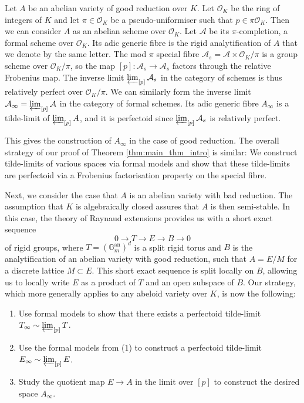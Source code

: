 \documentclass[10pt,oneside]{amsart}
\theoremstyle{definition}
\begin{document}
Let $A$ be an abelian variety of good reduction over $K$. Let $\mathcal O_K$ be the ring of integers of $K$ and let $\pi\in\mathcal O_K$ be a pseudo-uniformiser such that $p\in \pi\mathcal O_K$. Then we can consider $A$ as an abelian scheme over $\mathcal O_K$. Let $\mathcal A$ be its $\pi$-completion, a formal scheme over $\mathcal O_K$. Its adic generic fibre is the rigid analytification of $A$ that we denote by the same letter. The mod $\pi$ special fibre $\mathcal A_s = \mathcal A \times \mathcal O_K/\pi$ is a group scheme over $\mathcal O_K/\pi$, so the map $[p]:\mathcal A_s\rightarrow \mathcal A_s$ factors through the relative Frobenius map. The inverse limit $ \varprojlim_{[p]} \mathcal A_s $ in the category of schemes is thus relatively perfect over $\mathcal O_K/\pi$. We can similarly form the inverse limit $\mathcal A_{\infty} = \varprojlim_{[p]} \mathcal A$ in the category of formal schemes. Its adic generic fibre $A_\infty$ is a tilde-limit of $\varprojlim_{[p]}A$, and it is perfectoid since $ \varprojlim_{[p]} \mathcal A_s $ is relatively perfect.

This gives the construction of $A_\infty$ in the case of good reduction. The overall strategy of our proof of Theorem \ref{thm:main_thm_intro} is similar: We construct tilde-limits of various spaces via formal models and show that these tilde-limits are perfectoid via a Frobenius factorisation property on the special fibre. 

Next, we consider the case that $A$ is an abelian variety with bad reduction. The assumption that $K$ is algebraically closed assures that $A$ is then semi-stable.
In this case, the theory of Raynaud extensions provides us with a short exact sequence 
\[ 0 \rightarrow T \rightarrow E  \rightarrow  B  \rightarrow  0\]
of rigid groups, where $T = (\mathbb G_m^{\text{an}})^{d}$ is a split rigid torus and $B$ is the analytification of an abelian variety with good reduction, such that $A = E/M$ for a discrete lattice $M \subset E$. This short exact sequence is split locally on $B$, allowing us to locally write $E$ as a product of $T$ and an open subspace of $B$.
Our strategy, which more generally applies to any abeloid variety over $K$, is now the following:
\begin{enumerate}
\item Use formal models to show that there exists a perfectoid tilde-limit $T_\infty\sim\varprojlim_{[p]} T$.
\item Use the formal models from (1) to construct a perfectoid tilde-limit $E_\infty\sim\varprojlim_{[p]} E$.
\item Study the quotient map $E\rightarrow A$ in the limit over $[p]$ to construct the desired space $A_\infty$.
\end{enumerate}
\end{document}
